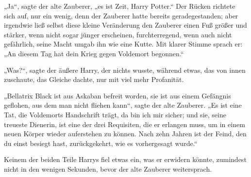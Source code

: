 „Ja“, sagte der alte Zauberer, „es ist Zeit, Harry Potter.“ Der Rücken richtete sich auf, nur ein wenig, denn der Zauberer hatte bereits geradegestanden; aber irgendwie ließ selbst diese kleine Veränderung den Zauberer einen Fuß größer und stärker, wenn nicht sogar jünger erscheinen, furchterregend, wenn auch nicht gefährlich, seine Macht umgab ihn wie eine Kutte. Mit klarer Stimme sprach er:
„An diesem Tag hat dein Krieg gegen Voldemort begonnen.“

„Was?“, sagte der äußere Harry, der nichts wusste, während etwas, das von innen zuschaute, das Gleiche dachte, nur mit viel mehr Profanität.

„Bellatrix Black ist aus Askaban befreit worden, sie ist aus einem Gefängnis geflohen, aus dem man nicht fliehen kann“, sagte der alte Zauberer.
„Es ist eine Tat, die Voldemorts Handschrift trägt, da bin ich mir sicher; und sie, seine treueste Dienerin, ist eine der drei Requisiten, die er erlangen muss, um in einem neuen Körper wieder auferstehen zu können. Nach zehn Jahren ist der Feind, den du einst besiegt hast, zurückgekehrt, wie es vorhergesagt wurde.“

Keinem der beiden Teile Harrys fiel etwas ein, was er erwidern könnte, zumindest nicht in den wenigen Sekunden, bevor der alte Zauberer weitersprach.

